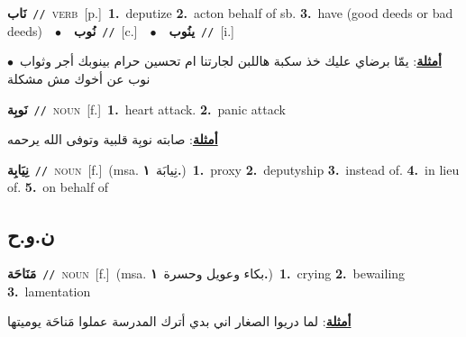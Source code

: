 \documentclass[10pt,a4paper,twoside]{article} %
\begin{document}
\begin{multicols}{2}
{\setlength\topsep{0pt}\textbf{\foreignlanguage{arabic}{نَاب}}\ {\color{gray}\texttt{//}\color{black}}\ \textsc{verb}\ [p.]\ \textbf{1.}~deputize  \textbf{2.}~acton behalf of sb.  \textbf{3.}~have (good deeds or bad deeds)\ \ $\bullet$\ \ \setlength\topsep{0pt}\textbf{\foreignlanguage{arabic}{نُوب}}\ {\color{gray}\texttt{//}\color{black}}\ [c.]\ \ $\bullet$\ \ \setlength\topsep{0pt}\textbf{\foreignlanguage{arabic}{ينُوب}}\ {\color{gray}\texttt{//}\color{black}}\ [i.]\  \begin{flushright}\color{gray}\foreignlanguage{arabic}{\textbf{\underline{\foreignlanguage{arabic}{أمثلة}}}: يمّا برضاي عليك خذ سكبة هاللبن لجارتنا ام تحسين حرام بينوبك أجر وثواب\ $\bullet$\ \  نوب عن أخوك مش مشكلة}\end{flushright}\color{black}} \vspace{2mm}

{\setlength\topsep{0pt}\textbf{\foreignlanguage{arabic}{نَوبِة}}\ {\color{gray}\texttt{//}\color{black}}\ \textsc{noun}\ [f.]\ \textbf{1.}~heart attack.  \textbf{2.}~panic attack\  \begin{flushright}\color{gray}\foreignlanguage{arabic}{\textbf{\underline{\foreignlanguage{arabic}{أمثلة}}}: صابته نوبِة قلبية وتوفى الله يرحمه}\end{flushright}\color{black}} \vspace{2mm}

{\setlength\topsep{0pt}\textbf{\foreignlanguage{arabic}{نِيَابِة}}\ {\color{gray}\texttt{//}\color{black}}\ \textsc{noun}\ [f.]\ \color{gray}(msa. \foreignlanguage{arabic}{نِيابَة}~\foreignlanguage{arabic}{\textbf{١.}})\color{black}\ \textbf{1.}~proxy  \textbf{2.}~deputyship  \textbf{3.}~instead of.  \textbf{4.}~in lieu of.  \textbf{5.}~on behalf of\ } \vspace{2mm}

\vspace{-3mm}
\subsection*{\color{blue}\foreignlanguage{arabic}{ن.و.ح}\color{blue}{}} 

{\setlength\topsep{0pt}\textbf{\foreignlanguage{arabic}{مَنَاحَة}}\ {\color{gray}\texttt{//}\color{black}}\ \textsc{noun}\ [f.]\ \color{gray}(msa. \foreignlanguage{arabic}{بكاء وعويل وحسرة}~\foreignlanguage{arabic}{\textbf{١.}})\color{black}\ \textbf{1.}~crying  \textbf{2.}~bewailing  \textbf{3.}~lamentation\  \begin{flushright}\color{gray}\foreignlanguage{arabic}{\textbf{\underline{\foreignlanguage{arabic}{أمثلة}}}: لما دريوا الصغار اني بدي أترك المدرسة عملوا مَناحَة يوميتها}\end{flushright}\color{black}} \vspace{2mm}


\end{multicols}
\end{document}
